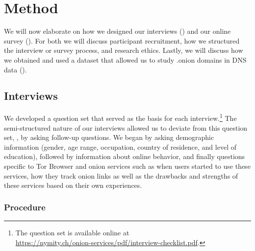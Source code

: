 \section{Method}
\label{sec:method}

We will now elaborate on how we designed our interviews ()
and our online survey ().  For both we will discuss
participant recruitment, how we structured the interview or survey process, and
research ethics.  Lastly, we will discuss how we obtained and used a dataset
that allowed us to study .onion domains in DNS data ().

\subsection{Interviews}
\label{sec:interviews}

We developed a question set that served as the basis for each
interview.\footnote{The question set is available online at\\
\url{https://nymity.ch/onion-services/pdf/interview-checklist.pdf}.}  The
semi-structured nature of our interviews allowed us to deviate from this
question set, \eg, by asking follow-up questions.  We began by asking
demographic information (gender, age range, occupation, country of residence,
and level of education), followed by information about online behavior, and
finally questions specific to Tor Browser and onion services such as when users
started to use these services, how they track onion links as well as the
drawbacks and strengths of these services based on their own experiences.

\subsubsection{Procedure}

